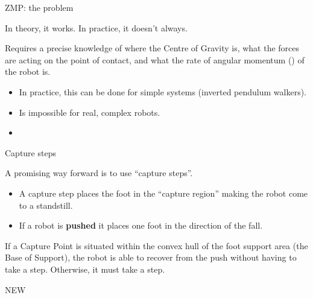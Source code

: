 \documentclass[compress]{beamer}
\begin{document}
\begin{frame}{ZMP: the problem}

    In theory, it works. In practice, it doesn't always.

    Requires a precise knowledge of where the Centre of Gravity is, what the
    forces are acting on the point of contact, and what the rate of angular
    momentum () of the robot is.

    \begin{itemize}

        \item In practice, this can be done for simple systems (inverted pendulum
            walkers).
        \item Is impossible for real, complex robots.
    \end{itemize}

    \begin{itemize}

        \item ~
    \end{itemize}

\end{frame}

\begin{frame}{Capture steps}

    A promising way forward is to use ``capture steps''.

    \begin{itemize}

        \item A capture step places the foot in the ``capture region'' making the
            robot come to a standstill.
        \item If a robot is \textbf{pushed} it places one foot in the direction of
            the fall.
    \end{itemize}

    If a Capture Point is situated within the convex hull of the foot
    support area (the Base of Support), the robot is able to recover from
    the push without having to take a step. Otherwise, it must take a step.

    NEW

\end{frame}
\end{document}

